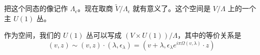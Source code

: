 把这个同态的像记作 $\Lambda_\epsilon$。现在取商 $\tilde V/\Lambda_\epsilon$ 就有意义了。这个空间是
$V/\Lambda$ 上的一个主 $U(1)$ 丛。

作为空间，我们的 $U(1)$ 丛可以写成 $(V\times U(1))/\Lambda$，其中的等价关系是
\begin{equation}
  (v,z)\sim(v,z)\cdot(\lambda,\epsilon_\lambda) = (v+\lambda,\epsilon_\lambda e^{i\pi\Omega(v,\lambda)}\cdot z)
  \tag{E.6}
  \label{eq:E.6}
\end{equation}



